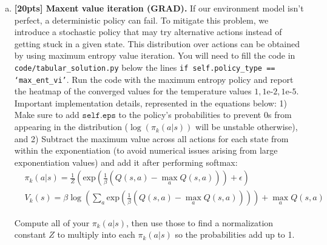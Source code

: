 \documentclass{article}
\begin{document}
\begin{enumerate}[(a)]
\newpage 

\item {\bf [20pts] Maxent value iteration \textbf{(GRAD)}.} If our environment model isn't perfect, a deterministic policy can fail. To mitigate this problem, we introduce a stochastic policy that may try alternative actions instead of getting stuck in a given state. This distribution over actions can be obtained by using maximum entropy value iteration.  You will need to fill the code in \texttt{code/tabular\_solution.py} below the lines \texttt{if self.policy\_type == `max\_ent\_vi'}. Run the code with the maximum entropy policy and report the heatmap of the converged values for the temperature values $1, 1\text{e-}2, 1\text{e-}5$. Important implementation details, represented in the equations below: 1) Make sure to add $\texttt{self.eps}$ to the policy's probabilities to prevent 0s from appearing in the distribution ($\log(\pi_k(a|s))$ will be unstable otherwise), and 2) Subtract the maximum value across all actions for each state from within the exponentiation (to avoid numerical issues arising from large exponentiation values) and add it after performing softmax:
\begin{align*}
    &\pi_k(a|s) = \frac{1}{Z} \left( \text{exp} \left( \frac{1}{\beta}(Q(s, a) - \max_a Q(s, a)) \right) + \epsilon \right) \\
        &V_k(s) = \beta \log \left(\sum_a \text{exp}\left(\frac{1}{\beta}(Q(s, a) - \max_a Q(s, a))\right) \right) + \max_a Q(s, a)
\end{align*}

Compute all of your $\pi_k(a|s)$, then use those to find a normalization constant $Z$ to multiply into each $\pi_k(a|s)$ so the probabilities add up to 1.


\end{enumerate}
\end{document}
